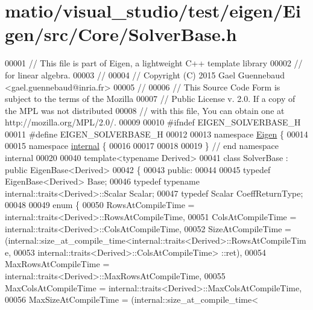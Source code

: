 \hypertarget{matio_2visual__studio_2test_2eigen_2_eigen_2src_2_core_2_solver_base_8h_source}{}\section{matio/visual\+\_\+studio/test/eigen/\+Eigen/src/\+Core/\+Solver\+Base.h}
\label{matio_2visual__studio_2test_2eigen_2_eigen_2src_2_core_2_solver_base_8h_source}

\begin{DoxyCode}
00001 \textcolor{comment}{// This file is part of Eigen, a lightweight C++ template library}
00002 \textcolor{comment}{// for linear algebra.}
00003 \textcolor{comment}{//}
00004 \textcolor{comment}{// Copyright (C) 2015 Gael Guennebaud <gael.guennebaud@inria.fr>}
00005 \textcolor{comment}{//}
00006 \textcolor{comment}{// This Source Code Form is subject to the terms of the Mozilla}
00007 \textcolor{comment}{// Public License v. 2.0. If a copy of the MPL was not distributed}
00008 \textcolor{comment}{// with this file, You can obtain one at http://mozilla.org/MPL/2.0/.}
00009 
00010 \textcolor{preprocessor}{#ifndef EIGEN\_SOLVERBASE\_H}
00011 \textcolor{preprocessor}{#define EIGEN\_SOLVERBASE\_H}
00012 
00013 \textcolor{keyword}{namespace }\hyperlink{namespace_eigen}{Eigen} \{
00014 
00015 \textcolor{keyword}{namespace }\hyperlink{namespaceinternal}{internal} \{
00016 
00017 
00018 
00019 \} \textcolor{comment}{// end namespace internal}
00020 
00040 \textcolor{keyword}{template}<\textcolor{keyword}{typename} Derived>
00041 \textcolor{keyword}{class }SolverBase : \textcolor{keyword}{public} EigenBase<Derived>
00042 \{
00043   \textcolor{keyword}{public}:
00044 
00045     \textcolor{keyword}{typedef} EigenBase<Derived> Base;
00046     \textcolor{keyword}{typedef} \textcolor{keyword}{typename} internal::traits<Derived>::Scalar Scalar;
00047     \textcolor{keyword}{typedef} Scalar CoeffReturnType;
00048 
00049     \textcolor{keyword}{enum} \{
00050       RowsAtCompileTime = internal::traits<Derived>::RowsAtCompileTime,
00051       ColsAtCompileTime = internal::traits<Derived>::ColsAtCompileTime,
00052       SizeAtCompileTime = (internal::size\_at\_compile\_time<internal::traits<Derived>::RowsAtCompileTime,
00053                                                           internal::traits<Derived>::ColsAtCompileTime>
      ::ret),
00054       MaxRowsAtCompileTime = internal::traits<Derived>::MaxRowsAtCompileTime,
00055       MaxColsAtCompileTime = internal::traits<Derived>::MaxColsAtCompileTime,
00056       MaxSizeAtCompileTime = (internal::size\_at\_compile\_time<

\end{DoxyCode}
